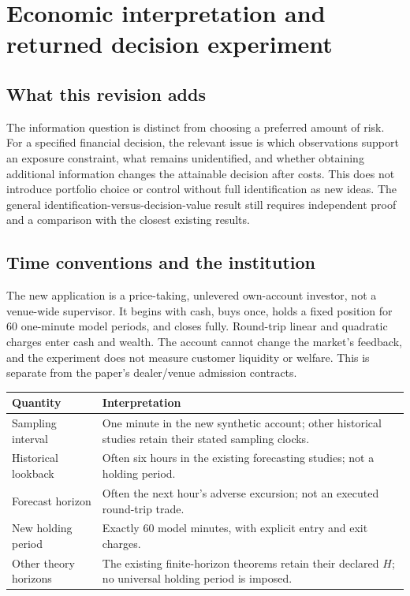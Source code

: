 \documentclass[12pt]{article}
\theoremstyle{definition}
\theoremstyle{remark}
\begin{document}

\section*{Economic interpretation and returned decision experiment}

\subsection*{What this revision adds}
The information question is distinct from choosing a preferred amount of risk.
For a specified financial decision, the relevant issue is which observations
support an exposure constraint, what remains unidentified, and whether obtaining
additional information changes the attainable decision after costs. This does
not introduce portfolio choice or control without full identification as new
ideas. The general identification-versus-decision-value result still requires
independent proof and a comparison with the closest existing results.

\subsection*{Time conventions and the institution}
The new application is a price-taking, unlevered own-account investor, not a
venue-wide supervisor. It begins with cash, buys once, holds a fixed position
for 60 one-minute model periods, and closes fully. Round-trip linear and
quadratic charges enter cash and wealth. The account cannot change the market's
feedback, and the experiment does not measure customer liquidity or welfare.
This is separate from the paper's dealer/venue admission contracts.

\begin{center}\small
\begin{tabular}{p{}p{}}
\toprule
Quantity & Interpretation\\
\midrule
Sampling interval & One minute in the new synthetic account; other historical studies retain their stated sampling clocks.\\
Historical lookback & Often six hours in the existing forecasting studies; not a holding period.\\
Forecast horizon & Often the next hour's adverse excursion; not an executed round-trip trade.\\
New holding period & Exactly 60 model minutes, with explicit entry and exit charges.\\
Other theory horizons & The existing finite-horizon theorems retain their declared $H$; no universal holding period is imposed.\\
\bottomrule
\end{tabular}
\end{center}
\end{document}
